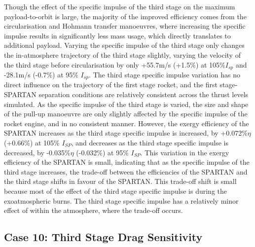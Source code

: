Though the effect of the specific impulse of the third stage on the maximum payload-to-orbit is large, the majority of the improved efficiency comes from the circularisation and Hohmann transfer manoeuvres, where increasing the specific impulse results in significantly less mass usage, which directly translates to additional payload. Varying the specific impulse of the third stage only changes the in-atmosphere trajectory of the third stage slightly, varying the velocity of the third stage before circularisation by only +55.7m/s (+1.5\%) at 105\%$I_{sp}$ and -28.1m/s (-0.7\%) at 95\% $I_{sp}$. 
The third stage specific impulse variation has no direct influence on the trajectory of the first stage rocket, and the first stage-SPARTAN separation conditions are relatively consistent across the thrust levels simulated.
As the specific impulse of the third stage is varied, the size and shape of the pull-up manoeuvre are only slightly affected by the specific impulse of the rocket engine, and in no consistent manner. 
 However, the exergy efficiency of the SPARTAN increases as the third stage specific impulse is increased, by +0.072\%$\eta$ (+0.66\%) at 105\% $I_{SP}$, and decreases as the third stage specific impulse is decreased, by -0.035\%$\eta$ (-0.032\%) at 95\% $I_{SP}$. This variation in the exergy efficiency of the SPARTAN is small, indicating that as the specific impulse of the third stage increases, the trade-off between the efficiencies of the SPARTAN and the third stage shifts in favour of the SPARTAN. This trade-off shift is small because most of the effect of the third stage specific impulse is during the exoatmospheric burns. The third stage specific impulse has a relatively minor effect of within the atmosphere, where the trade-off occurs. 


\subsection{Case 10: Third Stage Drag Sensitivity}


